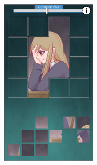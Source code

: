 \begin{figure}[h]
\begin{minipage}{.24\textwidth}
        \includegraphics[width=\textwidth]{imgs/screenshot-final2.png}
    \end{minipage}
    \begin{minipage}{.24\textwidth}

\end{minipage}
\end{figure}

